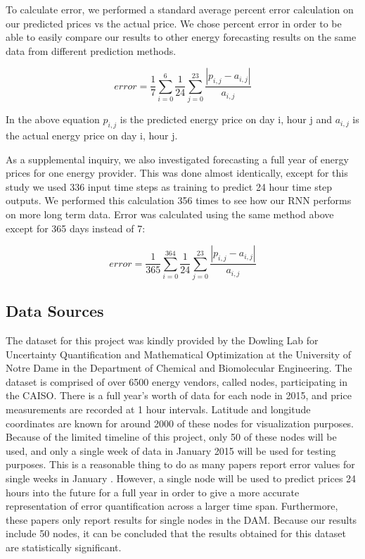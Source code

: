 \documentclass[sigconf]{acmart}
\begin{document}
To calculate error, we performed a standard average percent error calculation on our predicted prices vs the actual price. We chose percent error in order to be able to easily compare our results to other energy forecasting results on the same data from different prediction methods.

$$ error = \frac{1}{7}\sum_{i=0}^{6}\frac{1}{24}\sum_{j=0}^{23}\frac{|p_{i,j}-a_{i,j}|}{a_{i,j}}$$

In the above equation $p_{i,j}$ is the predicted energy price on day i, hour j and $a_{i,j}$ is the actual energy price on day i, hour j.

As a supplemental inquiry, we also investigated forecasting a full year of energy prices for one energy provider. This was done almost identically, except for this study we used 336 input time steps as training to predict 24 hour time step outputs. We performed this calculation 356 times to see how our RNN performs on more long term data. Error was calculated using the same method above except for 365 days instead of 7:

$$ error = \frac{1}{365}\sum_{i=0}^{364}\frac{1}{24}\sum_{j=0}^{23}\frac{|p_{i,j}-a_{i,j}|}{a_{i,j}}$$


\subsection{Data Sources}
The dataset for this project was kindly provided by the Dowling Lab for Uncertainty Quantification and Mathematical Optimization at the University of Notre Dame in the Department of Chemical and Biomolecular Engineering. The dataset is comprised of over 6500 energy vendors, called nodes, participating in the CAISO. There is a full year's worth of data for each node in 2015, and price measurements are recorded at 1 hour intervals. Latitude and longitude coordinates are known for around 2000 of these nodes for visualization purposes. Because of the limited timeline of this project, only 50 of these nodes will be used, and only a single week of data in January 2015 will be used for testing purposes.  This is a reasonable thing to do as many papers report error values for single weeks in January \cite{Conejo2005a,Garcia2005,Tan2010}. However, a single node will be used to predict prices 24 hours into the future for a full year in order to give a more accurate representation of error quantification across a larger time span. Furthermore, these papers only report results for single nodes in the DAM. Because our results include 50 nodes, it can be concluded that the results obtained for this dataset are statistically significant. 
\end{document}
